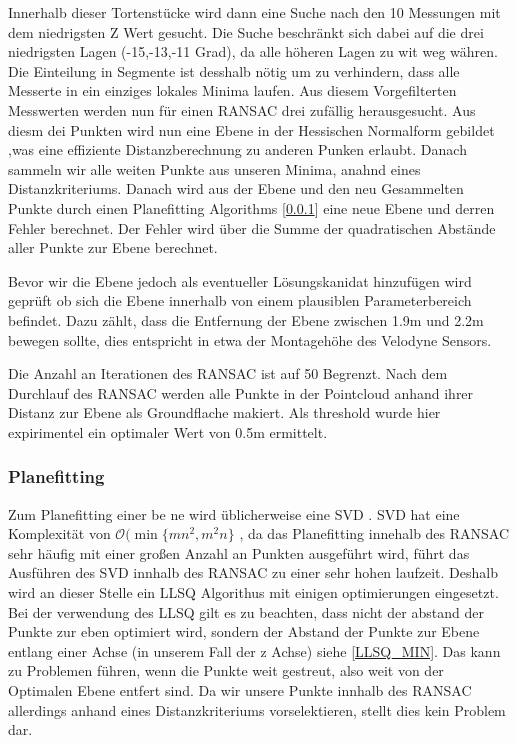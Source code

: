\documentclass[11pt,oneside,openright]{mpreport}
\begin{document}
Innerhalb dieser Tortenstücke wird dann eine Suche nach den 10 Messungen mit dem niedrigsten Z Wert gesucht. Die Suche beschränkt sich dabei auf die drei niedrigsten Lagen (-15,-13,-11 Grad),
da alle höheren Lagen zu wit weg währen. Die Einteilung in Segmente ist desshalb nötig um zu verhindern, dass alle Messerte in ein einziges lokales Minima laufen.
Aus diesem Vorgefilterten Messwerten werden nun für einen \ac{RANSAC} drei zufällig herausgesucht.
Aus diesm dei Punkten wird nun eine Ebene in der Hessischen Normalform gebildet ,was eine effiziente Distanzberechnung zu anderen Punken erlaubt. Danach sammeln wir alle weiten Punkte aus unseren Minima, anahnd eines Distanzkriteriums.
Danach wird aus der Ebene und den neu Gesammelten Punkte durch einen Planefitting Algorithms [\cref{subssec:planefitting}] eine neue Ebene und derren Fehler berechnet.
Der Fehler wird über die Summe der quadratischen Abstände aller Punkte zur Ebene berechnet.

Bevor wir die Ebene jedoch als eventueller Lösungskanidat hinzufügen wird geprüft ob sich die Ebene innerhalb von einem plausiblen Parameterbereich befindet.
Dazu zählt, dass die Entfernung der Ebene zwischen 1.9m und 2.2m bewegen sollte, dies entspricht in etwa der Montagehöhe des Velodyne Sensors.

Die Anzahl an Iterationen des \ac{RANSAC} ist auf 50 Begrenzt. Nach dem Durchlauf des \ac{RANSAC} werden alle Punkte in der Pointcloud anhand ihrer Distanz zur Ebene als
Groundflache makiert. Als threshold wurde hier expirimentel ein optimaler Wert von 0.5m ermittelt.


\subsubsection{Planefitting}
\label{subssec:planefitting}

Zum Planefitting einer be ne wird üblicherweise eine \ac{SVD}  \cite{Nurunnabi2012,Ram2007,Soderkvist2009}.
SVD hat eine Komplexität von $\mathcal{O}(\min\{mn^2, m^2n\}$ \cite{Holmes2007}, da das Planefitting innehalb 
des \ac{RANSAC} sehr häufig mit einer großen Anzahl an Punkten ausgeführt wird, führt das Ausführen des \ac{SVD} innhalb des \ac{RANSAC} zu einer sehr hohen laufzeit.
Deshalb wird an dieser Stelle ein \ac{LLSQ} Algorithus mit einigen optimierungen eingesetzt. Bei der verwendung des \ac{LLSQ} gilt es zu beachten,
dass nicht der abstand der Punkte zur eben optimiert wird, sondern der Abstand der Punkte zur Ebene entlang einer Achse (in unserem Fall der z Achse) siehe \cref{LLSQ_MIN}.
Das kann zu Problemen führen, wenn die Punkte weit gestreut, also weit von der Optimalen Ebene entfert sind. Da wir unsere Punkte innhalb des \ac{RANSAC} allerdings anhand eines 
Distanzkriteriums vorselektieren, stellt dies kein Problem dar.
\end{document}
